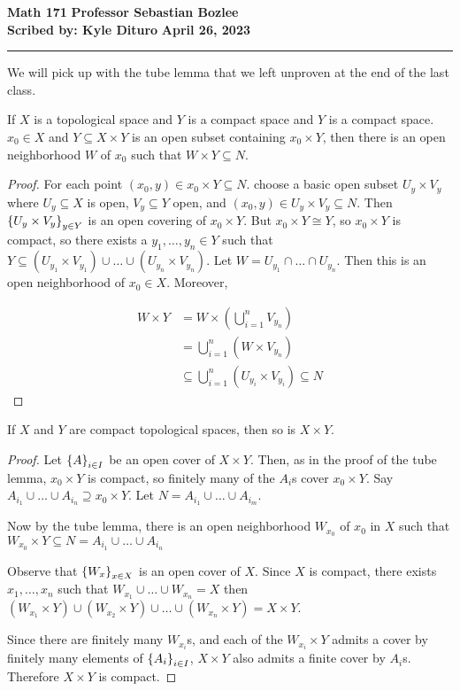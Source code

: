 \documentclass[12pt, twosided]{article}
\begin{document}
\noindent \textbf{Math 171} \hfill \textbf{Professor Sebastian Bozlee} \\
\textbf{Scribed by: Kyle Dituro} \hfill \textbf{April 26, 2023}\hrule
\vspace{.2in}
We will pick up with the tube lemma that we left unproven at the end of the last class.
\begin{lm}
  If \(X\) is a topological space and \(Y\) is a compact space and \(Y\) is a compact space. \(x_0 \in X\) and \(Y \subseteq X \times Y\) is an open subset containing \(x_0 \times Y\), then there is an open neighborhood \(W\) of \(x_0\) such that \(W \times Y \subseteq N\).
\end{lm}
\begin{proof}
  For each point \((x_0, y) \in x_0 \times Y \subseteq N\). choose a basic open subset \(U_y \times V_y\) where \(U_y \subseteq X\) is open, \(V_y \subseteq Y\) open, and \((x_0, y) \in U_y \times V_y \subseteq N\). Then \(\left\{ U_y \times V_y \right\}_{y \in Y}\) is an open covering of \(x_0 \times Y\). But \(x_0 \times Y \cong Y\), so \(x_0 \times Y\) is compact, so there exists a \(y_1, \ldots, y_n \in Y\) such that \(Y \subseteq (U_{y_1} \times V_{y_1})\cup \ldots \cup (U_{y_n} \times V_{y_n})\). Let \(W = U_{y_1} \cap \ldots \cap U_{y_n}\). Then this is an open neighborhood of \(x_0 \in X\). Moreover,

  \begin{align*}
    W \times Y &= W \times \left(\bigcup_{i=1}^nV_{y_n}\right) \\
               &=\bigcup_{i = 1}^n (W \times V_{y_n}) \\
               &\subseteq \bigcup_{i = 1}^n ( U_{y_i} \times V_{y_i}) \subseteq N
  \end{align*}
\end{proof}

\begin{thm}
  If \(X\) and \(Y\) are compact topological spaces, then so is \(X \times Y\).
\end{thm}

\begin{proof}
  Let \(\left\{ A \right\}_{i \in I}\) be an open cover of \(X \times Y\). Then, as in the proof of the tube lemma, \(x_0 \times Y\) is compact, so finitely many of the \(A_i\)s cover \(x_0 \times Y\). Say \(A_{i_1} \cup \ldots \cup A_{i_n} \supseteq x_0 \times Y\). Let \(N = A_{i_1} \cup \ldots \cup A_{i_m}\).

  Now by the tube lemma, there is an open neighborhood \(W_{x_0}\) of \(x_0\) in \(X\) such that \(W_{x_0} \times Y\subseteq N = A_{i_1} \cup \ldots\cup A_{i_n}\)

  Observe that  \(\left\{ W_x \right\}_{x \in X}\) is an open cover of \(X\). Since \(X\) is compact, there exists \(x_1, \ldots, x_n\) such that \(W_{x_1} \cup \ldots \cup W_{x_n} = X\) then \((W_{x_1} \times Y) \cup (W_{x_2} \times Y) \cup \ldots \cup (W_{x_n} \times Y) = X \times Y\).

  Since there are finitely many \(W_{x_i}\)s, and each of the \(W_{x_i} \times Y\) admits a cover by finitely many elements of \(\left\{ A_i \right\}_{i \in I}\), \(X \times Y\) also admits a finite cover by \(A_i\)s. Therefore \(X \times Y\) is compact.
\end{proof}
\end{document}
